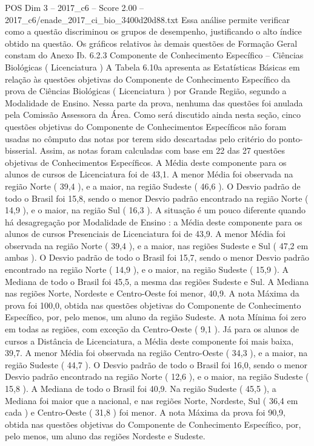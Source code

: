 \begin{textsample}{POS Dim 3 – 2017\_c6 – Score 2.00 – 2017\_c6/enade\_2017\_ci\_bio\_3400d20d88.txt}
Essa análise permite verificar como a questão discriminou os grupos de desempenho, justificando o alto índice obtido na questão.
Os gráficos relativos às demais questões de Formação Geral constam do Anexo Ib. 6.2.3 Componente de Conhecimento Específico – Ciências Biológicas ( Licenciatura ) A Tabela 6.10a apresenta as Estatísticas Básicas em relação às questões objetivas do Componente de Conhecimento Específico da prova de Ciências Biológicas ( Licenciatura ) por Grande Região, segundo a Modalidade de Ensino.
Nessa parte da prova, nenhuma das questões foi anulada pela Comissão Assessora da Área.
Como será discutido ainda nesta seção, cinco questões objetivas do Componente de Conhecimentos Específicos não foram usadas no cômputo das notas por terem sido descartadas pelo critério do ponto-bisserial.
Assim, as notas foram calculadas com base em 22 das 27 questões objetivas de Conhecimentos Específicos.
A Média deste componente para os alunos de cursos de Licenciatura foi de 43,1.
A menor Média foi observada na região Norte ( 39,4 ), e a maior, na região Sudeste ( 46,6 ).
O Desvio padrão de todo o Brasil foi 15,8, sendo o menor Desvio padrão encontrado na região Norte ( 14,9 ), e o maior, na região Sul ( 16,3 ).
A situação é um pouco diferente quando há desagregação por Modalidade de Ensino : a Média deste componente para os alunos de cursos Presenciais de Licenciatura foi de 43,9.
A menor Média foi observada na região Norte ( 39,4 ), e a maior, nas regiões Sudeste e Sul ( 47,2 em ambas ).
O Desvio padrão de todo o Brasil foi 15,7, sendo o menor Desvio padrão encontrado na região Norte ( 14,9 ), e o maior, na região Sudeste ( 15,9 ).
A Mediana de todo o Brasil foi 45,5, a mesma das regiões Sudeste e Sul.
A Mediana nas regiões Norte, Nordeste e Centro-Oeste foi menor, 40,9.
A nota Máxima da prova foi 100,0, obtida nas questões objetivas do Componente de Conhecimento Específico, por, pelo menos, um aluno da região Sudeste.
A nota Mínima foi zero em todas as regiões, com exceção da Centro-Oeste ( 9,1 ).
Já para os alunos de cursos a Distância de Licenciatura, a Média deste componente foi mais baixa, 39,7.
A menor Média foi observada na região Centro-Oeste ( 34,3 ), e a maior, na região Sudeste ( 44,7 ).
O Desvio padrão de todo o Brasil foi 16,0, sendo o menor Desvio padrão encontrado na região Norte ( 12,6 ), e o maior, na região Sudeste ( 15,8 ).
A Mediana de todo o Brasil foi 40,9.
Na região Sudeste ( 45,5 ), a Mediana foi maior que a nacional, e nas regiões Norte, Nordeste, Sul ( 36,4 em cada ) e Centro-Oeste ( 31,8 ) foi menor.
A nota Máxima da prova foi 90,9, obtida nas questões objetivas do Componente de Conhecimento Específico, por, pelo menos, um aluno das regiões Nordeste e Sudeste.

\end{textsample}
